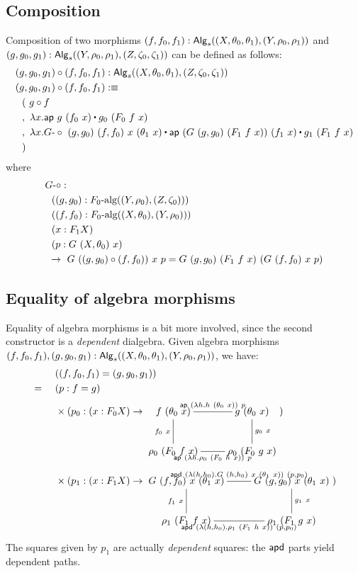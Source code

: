 \documentclass[a4paper,10pt]{report}
\begin{document}
\subsection{Composition}

Composition of two morphisms
$(f,f_0,f_1) : \mathsf{Alg}_s((X,\theta_0,\theta_1),(Y,\rho_0,\rho_1))$ and
$(g,g_0,g_1) : \mathsf{Alg}_s((Y,\rho_0,\rho_1),(Z,\zeta_0,\zeta_1))$ can be
defined as follows:
%
\begin{align*}
&(g,g_0,g_1) \circ (f,f_0,f_1) : \Alg_s((X,\theta_0,\theta_1),(Z,\zeta_0,\zeta_1)) \\
&(g,g_0,g_1) \circ (f,f_0,f_1) \ddefeq \\
&\ \ (\ g \circ f \\
&\ \ ,\ \lambda x . \ap\ g\ (f_0\ x) \ct g_0\ (F_0\ f\ x) \\
&\ \ ,\ \lambda x . \Gcomp\ (g,g_0)\ (f,f_0)\ x\ (\theta_1\ x) \ct \ap\ (G\ (g,g_0)\ (F_1\ f\ x))\ (f_1\ x) \ct g_1\ (F_1\ f\ x) \\
&\ \ )
\end{align*}
%
where
%
\begin{align*}
&\Gcomp : \\ 
&\ \ ((g,g_0) : \algcat{F_0}((Y,\rho_0),(Z,\zeta_0))) \\
&\ \ ((f,f_0) : \algcat{F_0}((X,\theta_0),(Y,\rho_0))) \\
&\ \ (x : F_1 X) \\
&\ \ (p : G\ (X,\theta_0)\ x) \\
&\ \to\ G\ ((g,g_0) \circ (f,f_0))\ x\ p = G\ (g,g_0)\ (F_1\ f\ x)\ (G\ (f,f_0)\ x\ p)
\end{align*}
%

\subsection{Equality of algebra morphisms}
Equality of algebra morphisms is a bit more involved, since the second
constructor is a \emph{dependent} dialgebra. Given algebra morphisms
$(f,f_0,f_1), (g,g_0,g_1) :
\mathsf{Alg}_s((X,\theta_0,\theta_1),(Y,\rho_0,\rho_1))$, we have:
%
\begin{align*}
  & &&\ ((f,f_0,f_1) = (g,g_0,g_1)) \\
  &=&&\ (p : f = g) \\
  & &&\ \times (p_0 : (x : F_0 X) \to 
  \xymatrix{
    f\ (\theta_0\ x) \ar@{-}[d]_{f_0\ x} \ar@{-}[r]^{\ap\ (\lambda h . h\ (\theta_0\ x))\ p}  &g\ (\theta_0\ x) \ar@{-}[d]^{g_0\ x} \\
    \rho_0\ (F_0\ f\ x) \ar@{-}[r]_{\ap\ (\lambda h . \rho_0\ (F_0\ h\ x))\ p} &\rho_0\ (F_0\ g\ x)
  }) \\
  & &&\ \times (p_1 : (x : F_1 X) \to
  \xymatrix{
    G\ (f,f_0)\ x\ (\theta_1\ x) \ar@{-}[d]_{f_1\ x} \ar@{-}[r]^{\apd\ (\lambda (h,h_0) . G\ (h,h_0)\ x\ (\theta_1\ x))\ (p,p_0)}  &G\ (g,g_0)\ x\ (\theta_1\ x) \ar@{-}[d]^{g_1\ x} \\
    \rho_1\ (F_1\ f\ x) \ar@{-}[r]_{\apd\ (\lambda (h,h_0) . \rho_1\ (F_1\ h\ x))\ (p,p_0)} &\rho_1\ (F_1\ g\ x)
  }) \\
\end{align*}
%
The squares given by $p_1$ are actually \emph{dependent} squares: the
$\mathsf{apd}$ parts yield dependent paths.
\end{document}
